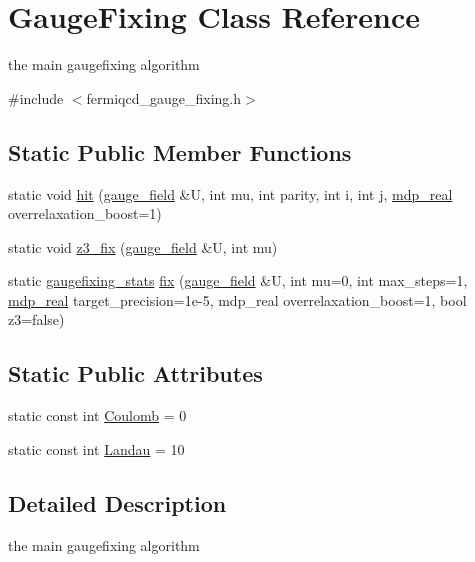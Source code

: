 \hypertarget{class_gauge_fixing}{}\section{Gauge\+Fixing Class Reference}
\label{class_gauge_fixing}


the main gaugefixing algorithm  




{\ttfamily \#include $<$fermiqcd\+\_\+gauge\+\_\+fixing.\+h$>$}

\subsection*{Static Public Member Functions}
\begin{DoxyCompactItemize}
\item 
static void \hyperlink{class_gauge_fixing_a19a0c4aeaa7caa8468d702238d223e0a}{hit} (\hyperlink{classgauge__field}{gauge\+\_\+field} \&U, int mu, int parity, int i, int j, \hyperlink{mdp__global__vars_8h_a69d96b74c791e0bbdb888b3913a69450}{mdp\+\_\+real} overrelaxation\+\_\+boost=1)
\item 
static void \hyperlink{class_gauge_fixing_af3a79f5db7d5c4cef7074938578eff80}{z3\+\_\+fix} (\hyperlink{classgauge__field}{gauge\+\_\+field} \&U, int mu)
\item 
static \hyperlink{classgaugefixing__stats}{gaugefixing\+\_\+stats} \hyperlink{class_gauge_fixing_a71359f7c7bd14c3c5d548cbf7e6793c5}{fix} (\hyperlink{classgauge__field}{gauge\+\_\+field} \&U, int mu=0, int max\+\_\+steps=1, \hyperlink{mdp__global__vars_8h_a69d96b74c791e0bbdb888b3913a69450}{mdp\+\_\+real} target\+\_\+precision=1e-\/5, mdp\+\_\+real overrelaxation\+\_\+boost=1, bool z3=false)
\end{DoxyCompactItemize}
\subsection*{Static Public Attributes}
\begin{DoxyCompactItemize}
\item 
static const int \hyperlink{class_gauge_fixing_a8be5d99ab21951db104df17ffdd7362f}{Coulomb} = 0
\item 
static const int \hyperlink{class_gauge_fixing_a115e0b47731237fd9ff984c7f6881994}{Landau} = 10
\end{DoxyCompactItemize}


\subsection{Detailed Description}
the main gaugefixing algorithm 

